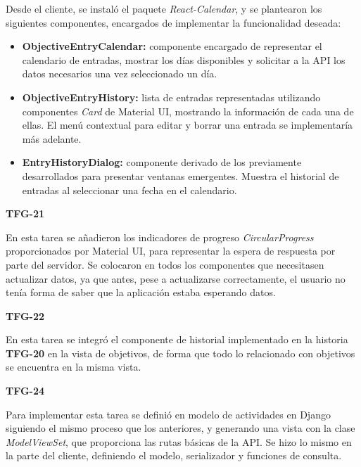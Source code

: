 \documentclass[10pt, a4paper]{aqademic}
\begin{document}
\medskip

Desde el cliente, se instaló el paquete \textit{React-Calendar}, y se plantearon los siguientes componentes, encargados de implementar la funcionalidad deseada:

\begin{itemize}
	\item \textbf{ObjectiveEntryCalendar:} componente encargado de representar el calendario de entradas, mostrar los días disponibles y solicitar a la API los datos necesarios una vez seleccionado un día.
	
	\item \textbf{ObjectiveEntryHistory:} lista de entradas representadas utilizando componentes \textit{Card} de Material UI, mostrando la información de cada una de ellas. El menú contextual para editar y borrar una entrada se implementaría más adelante.
	
	\item \textbf{EntryHistoryDialog:} componente derivado de los previamente desarrollados para presentar ventanas emergentes. Muestra el historial de entradas al seleccionar una fecha en el calendario.
\end{itemize}


\medskip

\textbf{TFG-21}

En esta tarea se añadieron los indicadores de progreso \textit{CircularProgress} proporcionados por Material UI, para representar la espera de respuesta por parte del servidor. Se colocaron en todos los componentes que necesitasen actualizar datos, ya que antes, pese a actualizarse correctamente, el usuario no tenía forma de saber que la aplicación estaba esperando datos.

\medskip

\textbf{TFG-22}

En esta tarea se integró el componente de historial implementado en la historia \textbf{TFG-20} en la vista de objetivos, de forma que todo lo relacionado con objetivos se encuentra en la misma vista. 

\medskip

\textbf{TFG-24}

Para implementar esta tarea se definió en modelo de actividades en Django siguiendo el mismo proceso que los anteriores, y generando una vista con la clase \textit{ModelViewSet}, que proporciona las rutas básicas de la API. Se hizo lo mismo en la parte del cliente, definiendo el modelo, serializador y funciones de consulta. 
\end{document}
